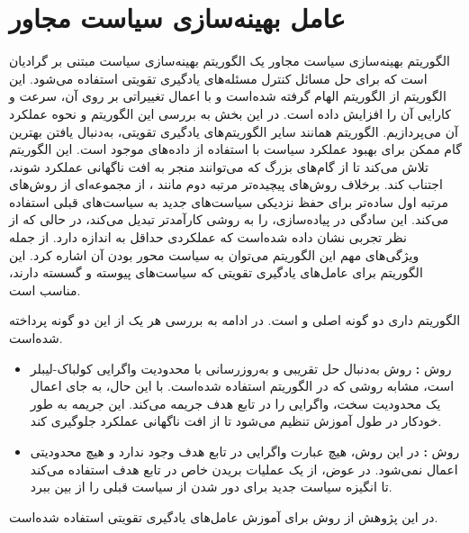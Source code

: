 \section{عامل بهینه‌سازی سیاست مجاور}\label{sec:PPO}
الگوریتم 
بهینه‌سازی سیاست مجاور
 یک الگوریتم بهینه‌سازی سیاست مبتنی بر گرادیان است که برای حل مسائل کنترل مسئله‌های یادگیری تقویتی استفاده می‌شود. این الگوریتم از الگوریتم 
 الهام گرفته شده‌است و با اعمال تغییراتی بر روی آن، سرعت و کارایی آن را افزایش داده است. در این بخش به بررسی این الگوریتم و نحوه عملکرد آن می‌پردازیم.
 الگوریتم  همانند سایر الگوریتم‌های یادگیری تقویتی، به‌دنبال یافتن بهترین گام ممکن برای بهبود عملکرد سیاست با استفاده از داده‌های موجود است. این الگوریتم تلاش می‌کند تا از گام‌های بزرگ که می‌توانند منجر به افت ناگهانی عملکرد شوند، اجتناب کند.
 برخلاف روش‌های پیچیده‌تر مرتبه دوم مانند 
 ، 
  از مجموعه‌ای از روش‌های مرتبه اول ساده‌تر برای حفظ نزدیکی سیاست‌های جدید به سیاست‌های قبلی استفاده می‌کند. این سادگی در پیاده‌سازی،  را به روشی کارآمدتر تبدیل می‌کند، در حالی که از نظر تجربی نشان داده شده‌است که عملکردی حداقل به اندازه  دارد.
  از جمله ویژگی‌های مهم این الگوریتم می‌توان به سیاست محور بودن آن اشاره کرد.
  این الگوریتم برای عامل‌های یادگیری تقویتی که سیاست‌های پیوسته و گسسته دارند، مناسب است.


  الگوریتم
  داری دو گونه اصلی 
    و
    است. در ادامه به بررسی هر یک از این دو گونه پرداخته شده‌است.
    \begin{itemize}
        \item
         روش\textbf{
         :}
        روش
         به‌دنبال حل تقریبی و به‌روز‌رسانی با 
        محدودیت واگرایی کولباک-لیبلر
است، مشابه روشی که در الگوریتم  استفاده شده‌است.
 با این حال، به جای اعمال یک محدودیت سخت،
  واگرایی  را در تابع هدف جریمه می‌کند. این جریمه به طور خودکار در طول آموزش تنظیم می‌شود تا از افت ناگهانی عملکرد جلوگیری کند.
    \item
     روش\textbf{
    :}
    در این روش، هیچ عبارت واگرایی  در تابع هدف وجود ندارد و هیچ محدودیتی اعمال نمی‌شود. در عوض،
     از یک عملیات بریدن خاص در تابع هدف استفاده می‌کند تا انگیزه سیاست جدید برای دور شدن از سیاست قبلی را از بین ببرد.    
    \end{itemize}
    در این پژوهش از روش 
    برای آموزش عامل‌های یادگیری تقویتی استفاده شده‌است.

